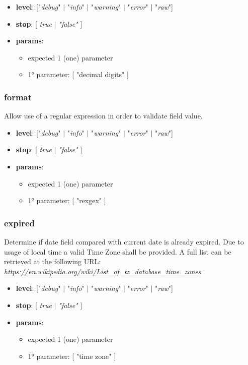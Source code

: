 \documentclass[12pt, a4paper]{book}
\begin{document}
\begin{itemize}
\item \textbf{level}: ["\textit{debug}" $|$ "\textit{info}" $|$ "\textit{warning}" $|$ "\textit{error}" $|$ "\textit{raw}"]
\item \textbf{stop}: [ \textit{true} $|$ \textit{"false"} ]
\item \textbf{params}: 
  \begin{itemize}
  \item expected 1 (one) parameter
  \item 1° parameter: [ "decimal digits" ]
  \end{itemize}
\end{itemize}


\subsubsection{format}
\begin{justify}
Allow use of a regular expression in order to validate field value.
\end{justify}

\begin{itemize}
\item \textbf{level}: ["\textit{debug}" $|$ "\textit{info}" $|$ "\textit{warning}" $|$ "\textit{error}" $|$ "\textit{raw}"]
\item \textbf{stop}: [ \textit{true} $|$ \textit{"false"} ]
\item \textbf{params}: 
  \begin{itemize}
  \item expected 1 (one) parameter
  \item 1° parameter: [ "rexgex" ]
  \end{itemize}
\end{itemize}

\newpage
\subsubsection{expired}
\begin{justify}
Determine if date field compared with current date is already expired.
Due to usage of local time a valid Time Zone shall be provided.
A full list can be retrieved at the following URL: \href{https://en.wikipedia.org/wiki/List_of_tz_database_time_zones}{\textit{https://en.wikipedia.org/wiki/List\_of\_tz\_database\_time\_zones}}.
\end{justify}

\begin{itemize}
\item \textbf{level}: ["\textit{debug}" $|$ "\textit{info}" $|$ "\textit{warning}" $|$ "\textit{error}" $|$ "\textit{raw}"]
\item \textbf{stop}: [ \textit{true} $|$ \textit{"false"} ]
\item \textbf{params}: 
  \begin{itemize}
  \item expected 1 (one) parameter
  \item 1° parameter: [ "time zone" ]
  \end{itemize}
\end{itemize}
\end{document}
